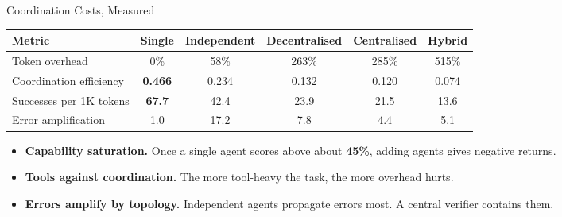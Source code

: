 \begin{frame}{Coordination Costs, Measured}
    \begin{center}
    \small
    \renewcommand{\arraystretch}{1.15}
    \begin{adjustbox}{max width=\linewidth}\begin{tabular}{lccccc}
        \toprule
        \textbf{Metric} & \textbf{Single} & \textbf{Independent} & \textbf{Decentralised} & \textbf{Centralised} & \textbf{Hybrid} \\
        \midrule
        Token overhead & 0\% & 58\% & 263\% & 285\% & \alert{515\%} \\
        Coordination efficiency & \textbf{0.466} & 0.234 & 0.132 & 0.120 & 0.074 \\
        Successes per 1K tokens & \textbf{67.7} & 42.4 & 23.9 & 21.5 & 13.6 \\
        \rowcolor{KAUSTcyan!12} Error amplification & 1.0 & \alert{17.2} & 7.8 & 4.4 & 5.1 \\
        \bottomrule
    \end{tabular}\end{adjustbox}
    \end{center}
    \begin{itemize}\itemsep0.45em
        \item \textbf{Capability saturation.} Once a single agent scores above about \textbf{45\%}, adding agents gives negative returns.
        \item \textbf{Tools against coordination.} The more tool-heavy the task, the more overhead hurts.
        \item \textbf{Errors amplify by topology.} Independent agents propagate errors most. A central verifier contains them.
    \end{itemize}
\end{frame}

